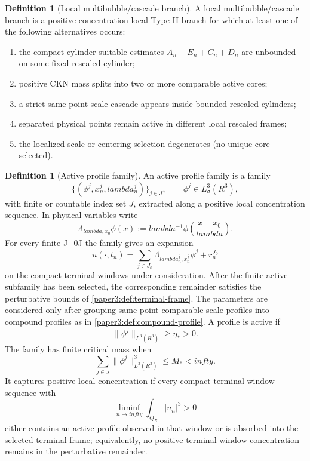 \documentclass[11pt]{amsart}
\def\({}%
\def\){}%
\def\mathbb#1{#1}%
\def\lambda{lambda}%
\def\infty{infty}%
\theoremstyle{plain}
\theoremstyle{definition}
\newtheorem{definition}[theorem]{Definition}
\theoremstyle{remark}
\begin{document}
\begin{definition}[Local multibubble/cascade branch]\label{paper3:def:local-multibubble}
A local multibubble/cascade branch is a positive-concentration local Type II
branch for which at least one of the following alternatives occurs:
\begin{enumerate}[label=\textup{(\roman*)}]
\item the compact-cylinder suitable estimates $A_n+E_n+C_n+D_n$ are unbounded on some
  fixed rescaled cylinder;
\item positive CKN mass splits into two or more comparable active cores;
\item a strict same-point scale cascade appears inside bounded rescaled cylinders;
\item separated physical points remain active in different local rescaled frames;
\item the localized scale or centering selection degenerates (no unique core
  selected).
\end{enumerate}
\end{definition}

\begin{definition}[Active profile family]\label{paper3:def:active-family}
An active profile family is a family
\[
  \{(\phi^j,x_n^j,\lambda_n^j)\}_{j\in J},
  \qquad \phi^j\in L^3_\sigma(\mathbb R^3),
\]
with finite or countable index set $J$, extracted along a positive local
concentration sequence.  In physical variables write
\[
  \Lambda_{\lambda,x_0}\phi(x):=\lambda^{-1}\phi\left(\frac{x-x_0}{\lambda}\right).
\]
For every finite \(J_0\subset J\) the family gives an expansion
\[
  u(\cdot,t_n)=\sum_{j\in J_0}\Lambda_{\lambda^j_n,x^j_n}\phi^j+r^{J_0}_n
\]
on the compact terminal windows under consideration.  After the finite active
subfamily has been selected, the corresponding remainder satisfies the
perturbative bounds of \cref{paper3:def:terminal-frame}.  The parameters are
considered only after grouping same-point comparable-scale profiles into
compound profiles as in \cref{paper3:def:compound-profile}.  A profile is active if
\[
  \|\phi^j\|_{L^3(\mathbb R^3)}\ge\eta_*>0.
\]
The family has finite critical mass when
\[
  \sum_{j\in J}\|\phi^j\|_{L^3(\mathbb R^3)}^3\le M_*<\infty .
\]
It captures positive local concentration if every compact terminal-window
sequence with
\[
  \liminf_{n\to\infty}\int_{Q_R}|u_n|^3>0
\]
either contains an active profile observed in that window or is absorbed into
the selected terminal frame; equivalently, no positive terminal-window
concentration remains in the perturbative remainder.
\end{definition}
\end{document}

